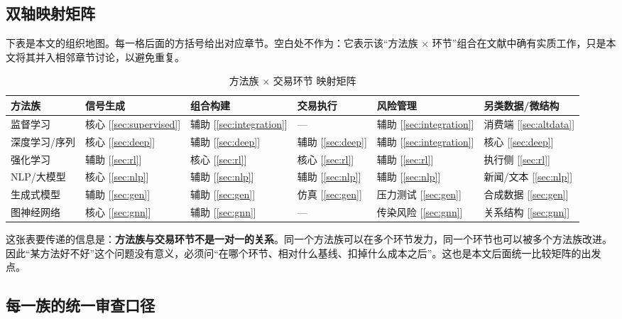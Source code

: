 \subsection{双轴映射矩阵}

下表是本文的组织地图。每一格后面的方括号给出对应章节。空白处不作为：它表示该“方法族 $\times$ 环节”组合在文献中确有实质工作，只是本文将其并入相邻章节讨论，以避免重复。

\begin{table}[htbp]
\centering
\caption{方法族 $\times$ 交易环节 映射矩阵}
\label{tab:framework}
\begin{tabular}{@{}>{\raggedright\arraybackslash}p{2.9cm}>{\raggedright\arraybackslash}p{2.2cm}>{\raggedright\arraybackslash}p{1.9cm}>{\raggedright\arraybackslash}p{1.9cm}>{\raggedright\arraybackslash}p{1.9cm}>{\raggedright\arraybackslash}p{2.2cm}@{}}
\toprule
方法族 & 信号生成 & 组合构建 & 交易执行 & 风险管理 & 另类数据/微结构 \\
\midrule
监督学习 & 核心 [\ref{sec:supervised}] & 辅助 [\ref{sec:integration}] & --- & 辅助 [\ref{sec:integration}] & 消费端 [\ref{sec:altdata}] \\
深度学习/序列 & 核心 [\ref{sec:deep}] & 辅助 [\ref{sec:deep}] & 辅助 [\ref{sec:deep}] & 辅助 [\ref{sec:integration}] & 核心 [\ref{sec:deep}] \\
强化学习 & 辅助 [\ref{sec:rl}] & 核心 [\ref{sec:rl}] & 核心 [\ref{sec:rl}] & 辅助 [\ref{sec:rl}] & 执行侧 [\ref{sec:rl}] \\
NLP/大模型 & 核心 [\ref{sec:nlp}] & 辅助 [\ref{sec:nlp}] & 辅助 [\ref{sec:nlp}] & 辅助 [\ref{sec:nlp}] & 新闻/文本 [\ref{sec:nlp}] \\
生成式模型 & 辅助 [\ref{sec:gen}] & 辅助 [\ref{sec:gen}] & 仿真 [\ref{sec:gen}] & 压力测试 [\ref{sec:gen}] & 合成数据 [\ref{sec:gen}] \\
图神经网络 & 核心 [\ref{sec:gnn}] & 辅助 [\ref{sec:gnn}] & --- & 传染风险 [\ref{sec:gnn}] & 关系结构 [\ref{sec:gnn}] \\
\bottomrule
\end{tabular}
\end{table}

这张表要传递的信息是：\textbf{方法族与交易环节不是一对一的关系}。同一个方法族可以在多个环节发力，同一个环节也可以被多个方法族改进。因此“某方法好不好”这个问题没有意义，必须问“在哪个环节、相对什么基线、扣掉什么成本之后”。这也是本文后面统一比较矩阵的出发点。

\subsection{每一族的统一审查口径}

